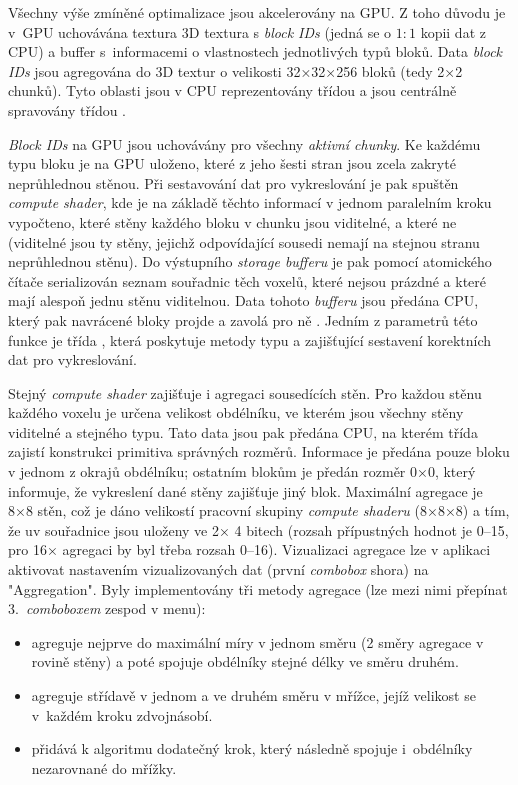 Všechny výše zmíněné optimalizace jsou akcelerovány na GPU. Z toho důvodu je v~GPU uchovávána textura 3D textura s \textit{block IDs} (jedná se o $1:1$ kopii dat z CPU) a buffer s~informacemi o vlastnostech jednotlivých typů bloků. Data \textit{block IDs} jsou agregována do 3D textur o velikosti 32×32×256 bloků (tedy 2×2 chunků). Tyto oblasti jsou v CPU reprezentovány třídou  a jsou centrálně spravovány třídou .

\textit{Block IDs} na GPU jsou uchovávány pro všechny \textit{aktivní chunky}. Ke každému typu bloku je na GPU uloženo, které z jeho šesti stran jsou zcela zakryté neprůhlednou stěnou. Při sestavování dat pro vykreslování je pak spuštěn \textit{compute shader}, kde je na základě těchto informací v jednom paralelním kroku vypočteno, které stěny každého bloku v chunku jsou viditelné, a které ne (viditelné jsou ty stěny, jejichž odpovídající sousedi nemají na stejnou stranu neprůhlednou stěnu). Do výstupního \textit{storage bufferu} je pak pomocí atomického čítače serializován seznam souřadnic těch voxelů, které nejsou prázdné a které mají alespoň jednu stěnu viditelnou. Data tohoto \textit{bufferu} jsou předána CPU, který pak navrácené bloky projde a zavolá pro ně . Jedním z parametrů této funkce je třída , která poskytuje metody typu  a  zajišťující sestavení korektních dat pro vykreslování.

Stejný \textit{compute shader} zajišťuje i agregaci sousedících stěn. Pro každou stěnu každého voxelu je určena velikost obdélníku, ve kterém jsou všechny stěny viditelné a stejného typu. Tato data jsou pak předána CPU, na kterém třída  zajistí konstrukci primitiva správných rozměrů. Informace je předána pouze bloku v jednom z okrajů obdélníku; ostatním blokům je předán rozměr 0×0, který  informuje, že vykreslení dané stěny zajišťuje jiný blok. Maximální agregace je 8×8 stěn, což je dáno velikostí pracovní skupiny \textit{compute shaderu} (8×8×8) a tím, že uv souřadnice jsou uloženy ve 2× 4 bitech (rozsah přípustných hodnot je 0–15, pro 16× agregaci by byl třeba rozsah 0–16). Vizualizaci agregace lze v aplikaci aktivovat nastavením vizualizovaných dat (první \textit{combobox} shora) na "Aggregation". Byly implementovány tři metody agregace (lze mezi nimi přepínat 3.~\textit{comboboxem} zespod v menu):
\begin{itemize}
	\item \textbf{} agreguje nejprve do maximální míry v jednom směru (2 směry agregace v rovině stěny) a poté spojuje obdélníky stejné délky ve směru druhém.
	\item \textbf{} agreguje střídavě v jednom a ve druhém směru v mřížce, jejíž velikost se v~každém kroku zdvojnásobí.
	\item \textbf{} přidává k algoritmu  dodatečný krok, který následně spojuje i~obdélníky nezarovnané do mřížky.
\end{itemize}

